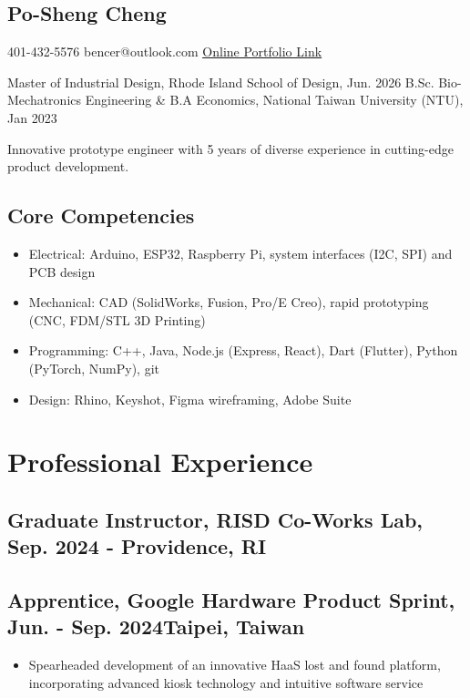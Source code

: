 \documentclass[12pt]{article}
\begin{document}
\begin{multicols}{2}
    \section*{Po-Sheng Cheng}
    401-432-5576 \newline
    bencer@outlook.com \newline
    \href{https://bencer3283.github.io/art/}{\underline{Online Portfolio Link}}
    
    \columnbreak
    {\sffamily \small \noindent
    Master of Industrial Design, Rhode Island School of Design, Jun. 2026 \newline
    B.Sc. Bio-Mechatronics Engineering \& \newline B.A Economics, National Taiwan University (NTU), Jan 2023
    }
\end{multicols}
{\small \noindent Innovative prototype engineer with 5 years of diverse experience in cutting-edge product development.}
\subsection*{Core Competencies}
{ \small \begin{itemize}
    \item Electrical: Arduino, ESP32, Raspberry Pi, system interfaces (I2C, SPI) and PCB design
    \item Mechanical: CAD (SolidWorks, Fusion, Pro/E Creo), rapid prototyping (CNC, FDM/STL 3D Printing)
    \item Programming: C++, Java, Node.js (Express, React), Dart (Flutter), Python (PyTorch, NumPy), git
    \item Design: Rhino, Keyshot, Figma wireframing, Adobe Suite
\end{itemize}}
    \section*{Professional Experience}
    \subsection*{Graduate Instructor, RISD Co-Works Lab, Sep. 2024 -  \hfill Providence, RI}
    
    \subsection*{Apprentice, Google Hardware Product Sprint, Jun. - Sep. 2024\hfill Taipei, Taiwan}
        { \small
        \begin{itemize}
            \item Spearheaded development of an innovative HaaS lost and found platform, incorporating advanced kiosk technology and intuitive software service
        \end{itemize}
        }
\end{document}
